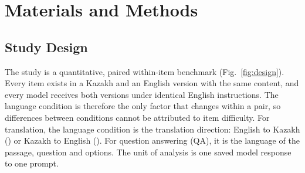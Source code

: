\section{Materials and Methods}
\label{sec:methods}

\subsection{Study Design}
The study is a quantitative, paired within-item benchmark (Fig.~\ref{fig:design}). Every item exists in a Kazakh and an English version with the same content, and every model receives both versions under identical English instructions. The language condition is therefore the only factor that changes within a pair, so differences between conditions cannot be attributed to item difficulty. For translation, the language condition is the translation direction: English to Kazakh (\ENKK) or Kazakh to English (\KKEN). For question answering (QA), it is the language of the passage, question and options. The unit of analysis is one saved model response to one prompt.

